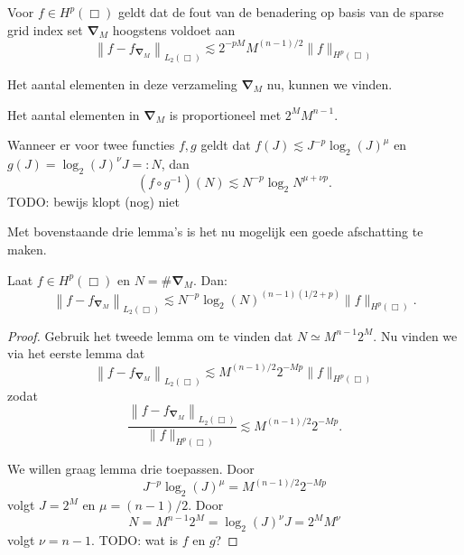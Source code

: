 \begin{lemm}{\cite[P3.2.3]{tammo}}
  Voor $f \in H^p(\Box)$ geldt dat de fout van de benadering op basis van de sparse grid index set $\boldsymbol{\nabla}_M$ hoogstens voldoet aan
  \[
  \left\| f - f_{\boldsymbol\nabla_M} \right\|_{L_2(\Box)} \lesssim 2^{-pM} M^{(n-1)/2} \| f \|_{H^p(\Box)}
  \]
\end{lemm}

Het aantal elementen in deze verzameling $\boldsymbol{\nabla}_M$ nu, kunnen we vinden.
\begin{lemm}{\cite[L3.3.1]{tammo}}
  Het aantal elementen in $\boldsymbol{\nabla}_M$ is proportioneel met $2^M M^{n-1}$.
\end{lemm}

\begin{lemm}
  Wanneer er voor twee functies $f, g$ geldt dat $f(J) \lesssim J^{-p}\log_2(J)^\mu$ en $g(J) = \log_2(J)^\nu J =: N$, dan
  \[
  (f \circ g^{-1})(N) \lesssim N^{-p} \log_2{N}^{\mu + \nu p}.
  \]
  TODO: bewijs klopt (nog) niet
\end{lemm}

Met bovenstaande drie lemma's is het nu mogelijk een goede afschatting te maken.
\begin{stelling}
\label{thm:fouttensor}
  Laat $f \in H^p(\Box)$ en $N = \#\boldsymbol{\nabla}_M$. Dan:
  \[
  \left\| f - f_{\boldsymbol\nabla_M} \right\|_{L_2(\Box)} \lesssim N^{-p} \log_2(N)^{(n-1)(1/2 + p)} \| f \|_{H^p(\Box)}.
  \]
\end{stelling}
\begin{proof}
  Gebruik het tweede lemma om te vinden dat $N \simeq M^{n-1}2^M$. Nu vinden we via het eerste lemma dat
  \[
  \left\| f - f_{\boldsymbol\nabla_M} \right\|_{L_2(\Box)} \lesssim M^{(n-1)/2}2^{-Mp}\| f \|_{H^p(\Box)}
  \]
  zodat
  \[
  \frac{\left\| f - f_{\boldsymbol\nabla_M}  \right\|_{L_2(\Box)}}{\| f \|_{H^p(\Box)}} \lesssim M^{(n-1)/2}2^{-Mp}.
  \]

  We willen graag lemma drie toepassen. Door
  \[
  J^{-p}\log_2(J)^\mu = M^{(n-1)/2} 2^{-Mp}
  \]
  volgt $J = 2^M$ en $\mu = (n-1)/2$. Door
  \[
  N = M^{n-1}2^M = \log_2(J)^\nu J = 2^M M^\nu
  \] volgt $\nu = n-1$. TODO: wat is $f$ en $g$?
\end{proof}

